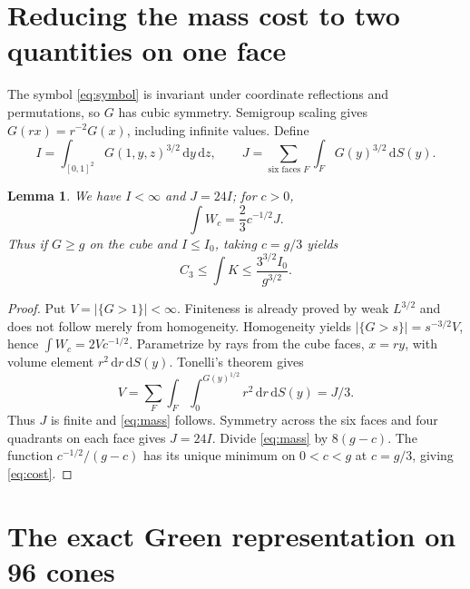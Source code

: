 \documentclass[11pt,a4paper]{article}
\newtheorem{lemma}[theorem]{Lemma}
\theoremstyle{definition}\newtheorem{definition}[theorem]{Definition}
\theoremstyle{remark}\newtheorem{remark}[theorem]{Remark}
\newcommand{\dd}{\,\mathrm d}
\newcommand{\abs}[1]{\left|#1\right|}
\begin{document}
\section{Reducing the mass cost to two quantities on one face}
The symbol \eqref{eq:symbol} is invariant under coordinate reflections and permutations, so $G$ has cubic symmetry. Semigroup scaling gives $G(rx)=r^{-2}G(x)$, including infinite values. Define
\begin{equation}\label{eq:I}
 I=\int_{[0,1]^2}G(1,y,z)^{3/2}\dd y\dd z,
 \qquad J=\sum_{\text{six faces }F}\int_FG(y)^{3/2}\dd S(y).
\end{equation}
\begin{lemma}\label{lem:mass}
We have $I<\infty$ and $J=24I$; for $c>0$,
\begin{equation}\label{eq:mass}
 \int W_c=\frac23c^{-1/2}J.
\end{equation}
Thus if $G\ge g$ on the cube and $I\le I_0$, taking $c=g/3$ yields
\begin{equation}\label{eq:cost}
 C_3\le\int K\le\frac{3^{3/2}I_0}{g^{3/2}}.
\end{equation}
\end{lemma}
\begin{proof}
Put $V=\abs{\{G>1\}}<\infty$. Finiteness is already proved by weak $L^{3/2}$ and does not follow merely from homogeneity. Homogeneity yields $\abs{\{G>s\}}=s^{-3/2}V$, hence $\int W_c=2Vc^{-1/2}$. Parametrize by rays from the cube faces, $x=ry$, with volume element $r^2\dd r\dd S(y)$. Tonelli's theorem gives
\[
 V=\sum_F\int_F\int_0^{G(y)^{1/2}}r^2\dd r\dd S(y)=J/3.
\]
Thus $J$ is finite and \eqref{eq:mass} follows. Symmetry across the six faces and four quadrants on each face gives $J=24I$. Divide \eqref{eq:mass} by $8(g-c)$. The function $c^{-1/2}/(g-c)$ has its unique minimum on $0<c<g$ at $c=g/3$, giving \eqref{eq:cost}.
\end{proof}

\section{The exact Green representation on 96 cones}
\end{document}
